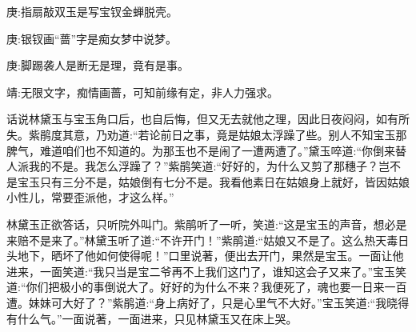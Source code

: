 

\begin{parag}
    \begin{note}庚:指扇敲双玉是写宝钗金蝉脱壳。\end{note}
\end{parag}


\begin{parag}
    \begin{note}庚:银钗画“蔷”字是痴女梦中说梦。\end{note}
\end{parag}


\begin{parag}
    \begin{note}庚:脚踢袭人是断无是理，竟有是事。\end{note}
\end{parag}


\begin{parag}
    \begin{note}靖:无限文字，痴情画蔷，可知前缘有定，非人力强求。\end{note}
\end{parag}


\begin{parag}
    话说林黛玉与宝玉角口后，也自后悔，但又无去就他之理，因此日夜闷闷，如有所失。紫鹃度其意，乃劝道:“若论前日之事，竟是姑娘太浮躁了些。别人不知宝玉那脾气，难道咱们也不知道的。为那玉也不是闹了一遭两遭了。”黛玉啐道:“你倒来替人派我的不是。我怎么浮躁了？”紫鹃笑道:“好好的，为什么又剪了那穗子？岂不是宝玉只有三分不是，姑娘倒有七分不是。我看他素日在姑娘身上就好，皆因姑娘小性儿，常要歪派他，才这么样。”
\end{parag}


\begin{parag}
    林黛玉正欲答话，只听院外叫门。紫鹃听了一听，笑道:“这是宝玉的声音，想必是来赔不是来了。”林黛玉听了道:“不许开门！”紫鹃道:“姑娘又不是了。这么热天毒日头地下，晒坏了他如何使得呢！”口里说著，便出去开门，果然是宝玉。一面让他进来，一面笑道:“我只当是宝二爷再不上我们这门了，谁知这会子又来了。”宝玉笑道:“你们把极小的事倒说大了。好好的为什么不来？我便死了，魂也要一日来一百遭。妹妹可大好了？”紫鹃道:“身上病好了，只是心里气不大好。”宝玉笑道:“我晓得有什么气。”一面说著，一面进来，只见林黛玉又在床上哭。
\end{parag}


